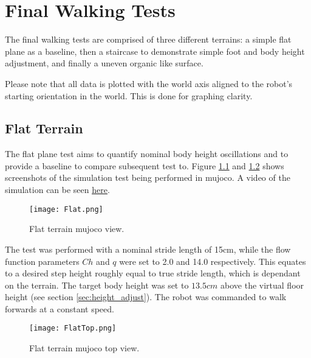 \chapter{Final Walking Tests}
    The final walking tests are comprised of three different terrains: a simple flat plane as a baseline, then a staircase to demonstrate simple foot and body height adjustment, and finally a uneven organic like surface.

    Please note that all data is plotted with the world axis aligned to the robot's starting orientation in the world. This is done for graphing clarity.
    

    \section{Flat Terrain}
    The flat plane test aims to quantify nominal body height oscillations and to provide a baseline to compare subsequent test to. Figure \ref{fig:plane_test} and \ref{fig:plane_test_top} shows screenshots of the simulation test being performed in \ac{mujoco}. A video of the simulation can be seen \href{https://youtu.be/pw4GzVp-8aQ}{\color{blue}\underline{here}}.
    \begin{figure}[h]
        \centering
        \texttt{[image: Flat.png]}
        \caption{Flat terrain \ac{mujoco} view.}
        \label{fig:plane_test}
    \end{figure}

    \noindent
    The test was performed with a nominal stride length of 15cm, while the flow function parameters \(Ch\) and \(q\) were set to 2.0 and 14.0 respectively. This equates to a desired step height roughly equal to true stride length, which is dependant on the terrain. The target body height was set to \(13.5cm\) above the virtual floor height (see section \ref{sec:height_adjust}). The robot was commanded to walk forwards at a constant speed.
    \begin{figure}[h]
        \centering
        \texttt{[image: FlatTop.png]}
        \caption{Flat terrain \ac{mujoco} top view.}
        \label{fig:plane_test_top}
    \end{figure}
    
